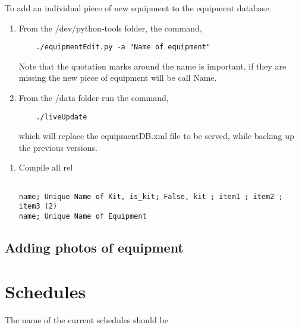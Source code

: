\documentclass[justified]{book}
\begin{document}
\noindent To add an individual piece of new equipment to the equipment database.

\begin{enumerate}
	\item From the /dev/python-tools folder, the command,

	\begin{lstlisting}
	./equipmentEdit.py -a "Name of equipment"       
	\end{lstlisting}

	Note that the quotation marks around the name is important, if they are missing the new piece 			of equipment will be call Name.

	\item From the /data folder run the command,
	
	\begin{lstlisting}
	./liveUpdate       
	\end{lstlisting}
	
	which will replace the equipmentDB.xml file to be served, while  backing up the previous 				versions.
	
\end{enumerate}
\begin{enumerate}
\item Compile all rel

	\begin{lstlisting}[backgroundcolor = \color{light-gray}, 	caption = The file info.csv needs to be in this form.
	               language = csv, xleftmargin = -2cm, xrightmargin = -2cm,
                   framexleftmargin = 1em
                   ]
                   
name; Unique Name of Kit, is_kit; False, kit ; item1 ; item2 ; item3 (2)
name; Unique Name of Equipment

\end{lstlisting}

\end{enumerate}

\subsection{Adding photos of equipment}


\section{Schedules}

\noindent The name of the current schedules should be
\end{document}

